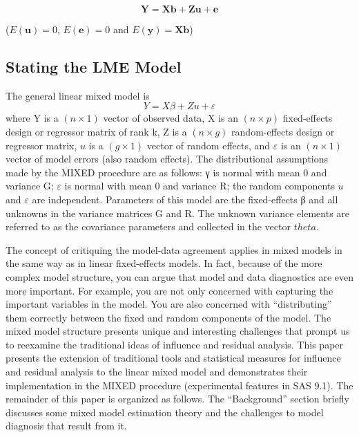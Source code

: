 \documentclass[MAIN.tex]{subfiles}
\begin{document}
\begin{equation}
\textbf{Y} = \textbf{Xb} + \textbf{Zu} + \textbf{e}
\end{equation}

($E(\textbf{u})=0$, $E(\textbf{e})=0 $ and $E(\textbf{y}) =
\textbf{Xb}$)

\subsection{Stating the LME Model}
The general linear mixed
model is
\[
Y = X\beta + Zu + \varepsilon\]
where Y is a $(n\times1)$ vector of observed data, X is an $(n\times p)$ fixed-effects design or regressor matrix of rank
k, Z is a $(n \times g)$ random-effects design or regressor matrix, $u$ is a $(g \times 1)$ vector of random effects, and $\varepsilon$ is
an $(n\times1)$ vector of model errors (also random effects). The distributional assumptions made by the MIXED
procedure are as follows: γ is normal with mean 0 and variance G; $\varepsilon$ is normal with mean 0 and variance
R; the random components $u$ and $\varepsilon$ are independent. Parameters of this model are the fixed-effects β and
all unknowns in the variance matrices G and R. The unknown variance elements are referred to as the
covariance parameters and collected in the vector $theta$.

The concept of critiquing the model-data agreement applies in mixed models in the same way as in linear
fixed-effects models. In fact, because of the more complex model structure, you can argue that model and
data diagnostics are even more important. For example, you are not only concerned with capturing the
important variables in the model. You are also concerned with “distributing” them correctly between the
fixed and random components of the model. The mixed model structure presents unique and interesting
challenges that prompt us to reexamine the traditional ideas of influence and residual analysis.
This paper presents the extension of traditional tools and statistical measures for influence and residual
analysis to the linear mixed model and demonstrates their implementation in the MIXED procedure (experimental
features in SAS 9.1). The remainder of this paper is organized as follows. The “Background” section
briefly discusses some mixed model estimation theory and the challenges to model diagnosis that result
from it.
\end{document}
